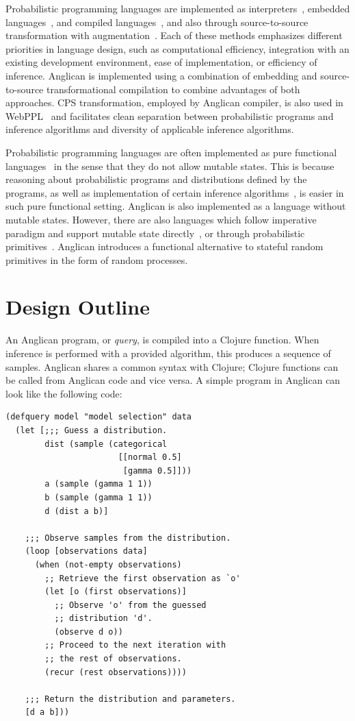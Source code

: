 \documentclass[preprint]{sigplanconf}
\begin{document}
Probabilistic programming languages are implemented as
interpreters~\cite{GMR+08,MSP14}, embedded
languages~\cite{P09,SGG15,GSX+16}, and compiled
languages~\cite{MMR+07,SDT14}, and also through source-to-source
transformation with augmentation~\cite{WSG11,GS15}. Each of
these methods emphasizes different priorities in language
design, such as computational efficiency, integration with an
existing development environment, ease of implementation, or
efficiency of inference. Anglican is implemented using a
combination of embedding and source-to-source transformational
compilation to combine advantages of both approaches.  CPS
transformation, employed by Anglican compiler, is also used in
WebPPL~\cite{GS15} and facilitates clean separation between
probabilistic programs and inference algorithms and diversity of
applicable inference algorithms.

Probabilistic programming languages are often implemented as
pure functional languages~\cite{GMR+08,MSP14,SGG15} in
the sense that they do not allow mutable states. This is
because reasoning about probabilistic programs and distributions
defined by the programs, as well as implementation of certain
inference algorithms~\cite{MYM+15}, is easier in such pure functional
setting. Anglican is also implemented as a language without
mutable states.  However, there are also languages which follow
imperative paradigm and support mutable state
directly~\cite{SDT14,GSX+16}, or through probabilistic
primitives~\cite{GMR+08,MSP14}. Anglican introduces a functional
alternative to stateful random primitives in the form of random
processes.

\section{Design Outline}
\label{sec:design}

An Anglican program, or \textit{query}, is compiled into a
Clojure function. When inference is performed with a provided
algorithm, this produces a sequence of samples. Anglican shares
a common syntax with Clojure; Clojure functions can be called
from Anglican code and vice versa. A simple program in Anglican
can look like the following code:
\begin{lstlisting}[style=default]
(defquery model "model selection" data
  (let [;;; Guess a distribution.
        dist (sample (categorical
                       [[normal 0.5]
                        [gamma 0.5]]))
        a (sample (gamma 1 1))
        b (sample (gamma 1 1))
        d (dist a b)]

    ;;; Observe samples from the distribution.
    (loop [observations data]
      (when (not-empty observations)
        ;; Retrieve the first observation as `o'
        (let [o (first observations)]
          ;; Observe 'o' from the guessed 
          ;; distribution 'd'.
          (observe d o))
        ;; Proceed to the next iteration with
        ;; the rest of observations.
        (recur (rest observations))))

    ;;; Return the distribution and parameters.
    [d a b]))
\end{lstlisting}
\end{document}
